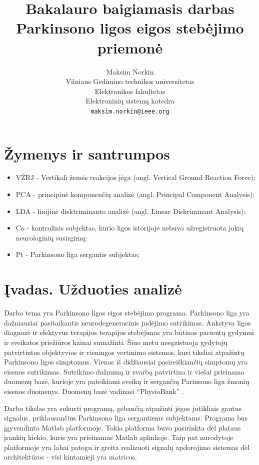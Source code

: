 \documentclass[]{vgtuef}
\author{Maksim Norkin\\Vilniaus Gedimino technikos
  universitetas\\Elektronikos fakultetas\\Elektroninių sistemų
  katedra\\\texttt{maksim.norkin@ieee.org}}
\title{Bakalauro baigiamasis darbas\\Parkinsono ligos eigos stebėjimo priemonė}
\begin{document}
\setcounter{page}{7}

\onehalfspacing

\layout

\tableofcontents

\section*{Žymenys ir santrumpos}

\begin{itemize}
\item VŽRJ - Vertikali žemės reakcijos jėga (angl. Vertical Ground Reaction Force);
\item PCA - principinė komponenčių analizė (angl. Principal Component Analysis);
\item LDA - linijinė disktriminanto analizė (angl. Linear Diskriminant Analysis);
\item Co - kontrolinis subjektas, kurio ligos istorijoje nebuvo užregistruota jokių neurologinių susirgimų;
\item Pt - Parkinsono liga sergantis subjektas;
\end{itemize}

\section{Įvadas. Užduoties analizė}

Darbo tema yra Parkinsono ligos eigos stebėjimo programa. Parkinsono liga yra dažniausiai pasitaikantis neurodegeneracinis judėjimo sutrikimas. Ankstyva ligos diagnozė ir efektyvus terapijos terapijos stebėjimas yra būtinas pacientų gydymui ir sveikatos priežiūros kainai sumažinti. Šiuo metu neegzistuoja gydytojų patvirtintos objektyvios ir vieningos vertinimo sistemos, kuri tiksliai atpažintų Parkinsono ligos simptomus. Vienas iš didžiausiai pasireiškiančių simptomų yra eisenos sutrikimas. Sutrikimo dažnumą ir svarbą patvirtina ir viešai prieinama duomenų bazė, kurioje yra pateikiami sveikų ir sergančių Parinsono liga žmonių eisenos duomenys. Duomenų bazė vadinasi ``PhysioBank'' \cite{932728}.

Darbo tikslas yra sukurti programą, gebančią atpažinti jėgos jutikliais gautus signalus, priklausančius Parkinsono liga sergantiems subjektams. Programa bus įgyvendinta Matlab platformoje. Tokia platforma buvo pasirinkta dėl plataus įrankių kiekio, kuris yra prieinamas Matlab aplinkoje. Taip pat nurodytoje platformoje yra labai patogu ir greita realizuoti signalų apdorojimo sistemas dėl architektūros - visi kintamieji yra matricos. 
\end{document}
